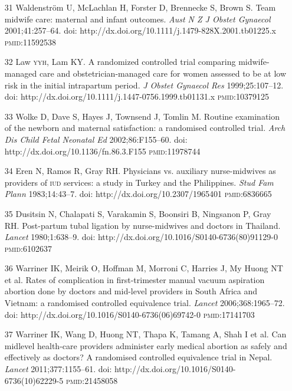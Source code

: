 \documentclass{article}
\begin{document}
\begin{itemize}
\item[31] Waldenström U, McLachlan H, Forster D, Brennecke S, Brown S. Team
midwife care:
maternal and infant outcomes. \textit{Aust N Z J Obstet Gynaecol}
2001;41:257–64. doi:
http://dx.doi.org/10.1111/j.1479-828X.2001.tb01225.x \textsc{pmid}:11592538

\item[32] Law \textsc{yyh}, Lam KY. A randomized controlled trial comparing
midwife-managed care and
obstetrician-managed care for women assessed to be at low risk in the initial
intrapartum period.
\textit{J Obstet Gynaecol Res}
1999;25:107–12. doi:
http://dx.doi.org/10.1111/j.1447-0756.1999.tb01131.x \textsc{pmid}:10379125

\item[33] Wolke D, Dave S, Hayes J, Townsend J, Tomlin M. Routine examination of
the newborn
and maternal satisfaction: a randomised controlled trial. \textit{Arch Dis Child
Fetal Neonatal
Ed}
2002;86:F155–60. doi: http://dx.doi.org/10.1136/fn.86.3.F155
\textsc{pmid}:11978744

\item[34] Eren N, Ramos R, Gray RH. Physicians vs. auxiliary nurse-midwives as
providers of
\textsc{iud} services: a study in Turkey and the Philippines. \textit{Stud Fam Plann}
1983;14:43–7.
doi: http://dx.doi.org/10.2307/1965401 \textsc{pmid}:6836665

\item[35] Dusitsin N, Chalapati S, Varakamin S, Boonsiri B, Ningsanon P, Gray
RH. Post-partum
tubal ligation by nurse-midwives and doctors in Thailand. \textit{Lancet}
1980;1:638–9. doi:
http://dx.doi.org/10.1016/S0140-6736(80)91129-0 \textsc{pmid}:6102637

\item[36] Warriner IK, Meirik O, Hoffman M, Morroni C, Harries J, My Huong NT et
al. Rates of
complication in first-trimester manual vacuum aspiration abortion done by
doctors and mid-level
providers in South Africa and Vietnam: a randomised controlled equivalence
trial.
\textit{Lancet}
2006;368:1965–72. doi: http://dx.doi.org/10.1016/S0140-6736(06)69742-0
\textsc{pmid}:17141703

\item[37] Warriner IK, Wang D, Huong NT, Thapa K, Tamang A, Shah I et al. Can
midlevel
health-care providers administer early medical abortion as safely and
effectively as doctors? A
randomised controlled equivalence trial in Nepal. \textit{Lancet}
2011;377:1155–61. doi:
http://dx.doi.org/10.1016/S0140-6736(10)62229-5 \textsc{pmid}:21458058


\end{itemize}
\end{document}
